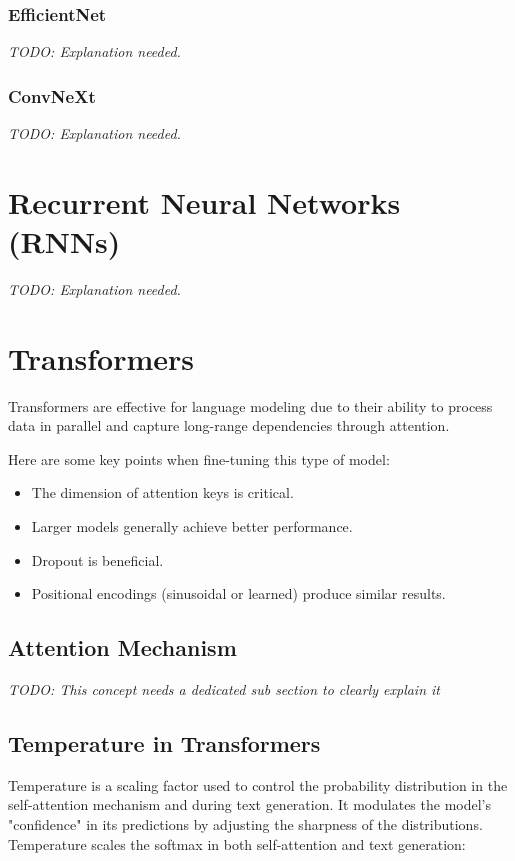 \documentclass{article}
\begin{document}
\subsubsection{EfficientNet}
\textit{TODO: Explanation needed.}

\subsubsection{ConvNeXt}
\textit{TODO: Explanation needed.}

\section{Recurrent Neural Networks (RNNs)}
\textit{TODO: Explanation needed.}

\clearpage\newpage

\section{Transformers}
Transformers are effective for language modeling due to their ability to process data in parallel and capture long-range dependencies through attention.

Here are some key points when fine-tuning this type of model:
\begin{itemize}
    \item The dimension of attention keys is critical.
    \item Larger models generally achieve better performance.
    \item Dropout is beneficial.
    \item Positional encodings (sinusoidal or learned) produce similar results.
\end{itemize}

\subsection{Attention Mechanism}
\textit{TODO: This concept needs a dedicated sub section to clearly explain it}

\subsection{Temperature in Transformers}
Temperature is a scaling factor used to control the probability distribution in the self-attention mechanism and during text generation. It modulates the model’s "confidence" in its predictions by adjusting the sharpness of the distributions. Temperature scales the softmax in both self-attention and text generation:
\end{document}
